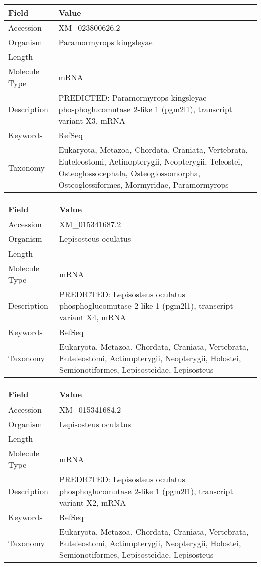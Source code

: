 \documentclass[10pt]{article}
\begin{document}
\vspace{1em}
{\footnotesize
\begin{longtable}{>{\raggedright\arraybackslash}p{4.5cm} >{\raggedright\arraybackslash}p{11.5cm}}
\textbf{Field} & \textbf{Value} \\
\hline
Accession & XM\_023800626.2 \\
Organism & Paramormyrops kingsleyae \\
Length & 5961 \\
Molecule Type & mRNA \\
Description & PREDICTED: Paramormyrops kingsleyae phosphoglucomutase 2-like 1 (pgm2l1), transcript variant X3, mRNA \\
Keywords & RefSeq \\
Taxonomy & Eukaryota, Metazoa, Chordata, Craniata, Vertebrata, Euteleostomi, Actinopterygii, Neopterygii, Teleostei, Osteoglossocephala, Osteoglossomorpha, Osteoglossiformes, Mormyridae, Paramormyrops \\
\end{longtable}
}

\vspace{1em}
{\footnotesize
\begin{longtable}{>{\raggedright\arraybackslash}p{4.5cm} >{\raggedright\arraybackslash}p{11.5cm}}
\textbf{Field} & \textbf{Value} \\
\hline
Accession & XM\_015341687.2 \\
Organism & Lepisosteus oculatus \\
Length & 7084 \\
Molecule Type & mRNA \\
Description & PREDICTED: Lepisosteus oculatus phosphoglucomutase 2-like 1 (pgm2l1), transcript variant X4, mRNA \\
Keywords & RefSeq \\
Taxonomy & Eukaryota, Metazoa, Chordata, Craniata, Vertebrata, Euteleostomi, Actinopterygii, Neopterygii, Holostei, Semionotiformes, Lepisosteidae, Lepisosteus \\
\end{longtable}
}

\vspace{1em}
{\footnotesize
\begin{longtable}{>{\raggedright\arraybackslash}p{4.5cm} >{\raggedright\arraybackslash}p{11.5cm}}
\textbf{Field} & \textbf{Value} \\
\hline
Accession & XM\_015341684.2 \\
Organism & Lepisosteus oculatus \\
Length & 7190 \\
Molecule Type & mRNA \\
Description & PREDICTED: Lepisosteus oculatus phosphoglucomutase 2-like 1 (pgm2l1), transcript variant X2, mRNA \\
Keywords & RefSeq \\
Taxonomy & Eukaryota, Metazoa, Chordata, Craniata, Vertebrata, Euteleostomi, Actinopterygii, Neopterygii, Holostei, Semionotiformes, Lepisosteidae, Lepisosteus \\
\end{longtable}
}
\end{document}
